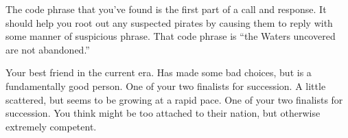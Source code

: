 \documentclass[char]{GL2020}
\begin{document}
\begin{itemz}[Notes]
	\item The code phrase that you've found is the first part of a call and response. It should help you root out any suspected pirates by causing them to reply with some manner of suspicious phrase. That code phrase is ``the Waters uncovered are not abandoned.''
\end{itemz}

\begin{contacts}
	\contact{\cChupAvenger{}} Your best friend in the current era. Has made some bad choices, but is a fundamentally good person.
	\contact{\cMusic{}} One of your two finalists for succession. A little scattered, but seems to be growing at a rapid pace.
	\contact{\cBeetle{}} One of your two finalists for succession. You think \cBeetle{\they} might be too attached to their nation, but \cBeetle{\theyare} otherwise extremely competent.
\end{contacts}
\end{document}
